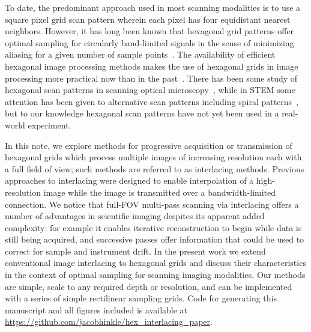 \documentclass{article}
\begin{document}
To date, the predominant approach used in most scanning modalities is to use a square pixel grid scan pattern wherein each pixel has four equidistant nearest neighbors.
%
However, it has long been known that hexagonal grid patterns offer optimal sampling for circularly band-limited signals in the sense of minimizing aliasing for a given number of sample points~\citep{petersen1962}.
%
The availability of efficient hexagonal image processing methods makes the use
of hexagonal grids in image processing more practical now than in the past~\citep{birdsong2016hexfft,middleton2006hexagonal}.
%
There has been some study of hexagonal scan patterns in scanning optical
microscopy~\citep{heintzmann2007}, while in STEM some attention has been given to alternative scan patterns including spiral patterns~\citep{sang2016dynamic}, but to our knowledge hexagonal scan patterns have not yet been used in a real-world experiment.


In this note, we explore methods for progressive acquisition or transmission of hexagonal grids which process multiple images of increasing resolution each with a full field of view; such methods are referred to as interlacing methods.
%
Previous approaches to interlacing were designed to enable interpolation of a
high-resolution image while the image is transmitted over a bandwidth-limited connection.
%
We notice that full-FOV multi-pass scanning via interlacing offers a number of
advantages in scientific imaging despites its apparent added complexity: for
example it enables iterative reconstruction to begin while data is still being
acquired, and successive passes offer information that could be used to correct
for sample and instrument drift.
%
In the present work we extend conventional image interlacing to hexagonal grids and discuss their characteristics in the context of optimal sampling for scanning imaging modalities.
%
Our methods are simple, scale to any required depth or resolution, and can be
implemented with a series of simple rectilinear sampling grids.
%
Code for generating this manuscript and all figures included is available at
\url{https://github.com/jacobhinkle/hex_interlacing_paper}.


\end{document}
